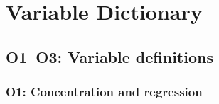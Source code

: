 
\section{Variable Dictionary}
\label{app:o4-dictionary}
\label{app:variable-dictionary}
\subsection{O1--O3: Variable definitions}
\label{app:team-variables}
\subsubsection{O1: Concentration and regression}
\label{app:o1-definitions}
\label{app:o1-dictionary}
\begingroup
\color{black}\small{}
\renewcommand{\arraystretch}{1.2}
\setlength{\tabcolsep}{5pt}
\captionsetup{font=small,labelfont=bf,justification=centering,singlelinecheck=false,skip=6pt}
